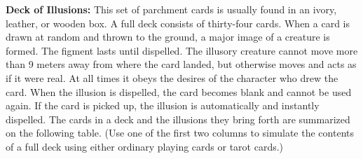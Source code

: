 


\textbf{Deck of Illusions:} This set of parchment cards is usually found in an ivory, leather, or wooden box. A full deck consists of thirty-four cards. When a card is drawn at random and thrown to the ground, a major image of a creature is formed. The figment lasts until dispelled. The illusory creature cannot move more than 9 meters away from where the card landed, but otherwise moves and acts as if it were real. At all times it obeys the desires of the character who drew the card. When the illusion is dispelled, the card becomes blank and cannot be used again. If the card is picked up, the illusion is automatically and instantly dispelled. The cards in a deck and the illusions they bring forth are summarized on the following table. (Use one of the first two columns to simulate the contents of a full deck using either ordinary playing cards or tarot cards.)

